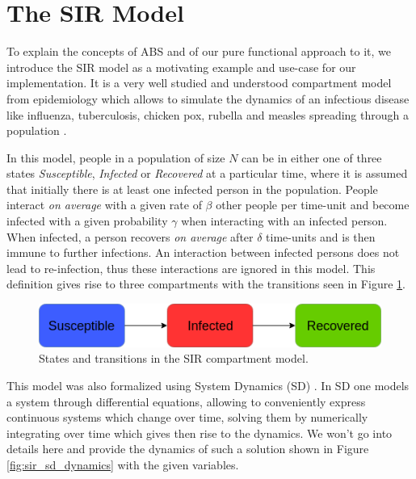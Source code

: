 \section{The SIR Model}
\label{sec:sir_model}
To explain the concepts of ABS and of our pure functional approach to it, we introduce the SIR model as a motivating example and use-case for our implementation. It is a very well studied and understood compartment model from epidemiology \cite{kermack_contribution_1927} which allows to simulate the dynamics of an infectious disease like influenza, tuberculosis, chicken pox, rubella and measles spreading through a population \cite{enns_its_2010}.

In this model, people in a population of size $N$ can be in either one of three states \textit{Susceptible}, \textit{Infected} or \textit{Recovered} at a particular time, where it is assumed that initially there is at least one infected person in the population. People interact \textit{on average} with a given rate of $\beta$ other people per time-unit and become infected with a given probability $\gamma$ when interacting with an infected person. When infected, a person recovers \textit{on average} after $\delta$ time-units and is then immune to further infections. An interaction between infected persons does not lead to re-infection, thus these interactions are ignored in this model. This definition gives rise to three compartments with the transitions seen in Figure \ref{fig:sir_transitions}.

\begin{figure}
	\centering
	\includegraphics[width=.4\textwidth, angle=0]{./fig/diagrams/SIR_transitions.png}
	\caption{States and transitions in the SIR compartment model.}
	\label{fig:sir_transitions}
\end{figure}

This model was also formalized using System Dynamics (SD) \cite{porter_industrial_1962}. In SD one models a system through differential equations, allowing to conveniently express continuous systems which change over time, solving them by numerically integrating over time which gives then rise to the dynamics. We won't go into details here and provide the dynamics of such a solution shown in Figure \ref{fig:sir_sd_dynamics} with the given variables.

